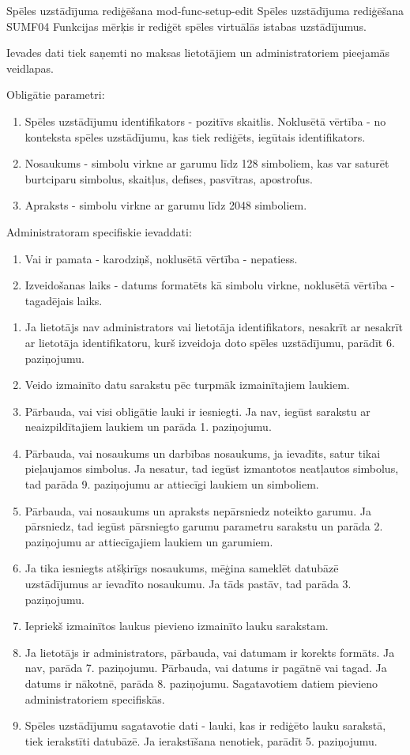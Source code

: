 \moduleFunctionTable
{Spēles uzstādījuma rediģēšana}
{mod-func-setup-edit}
{Spēles uzstādījuma rediģēšana}
{SUMF04}
{
	Funkcijas mērķis ir rediģēt spēles virtuālās istabas uzstādījumus.
}
{
	Ievades dati tiek saņemti no maksas lietotājiem un administratoriem pieejamās veidlapas.

	Obligātie parametri:
	\begin{enumerate}
		\item Spēles uzstādījumu identifikators - pozitīvs skaitlis.
		      Noklusētā vērtība - no konteksta spēles uzstādījumu, kas tiek rediģēts, iegūtais identifikators.
		\item Nosaukums - simbolu virkne ar garumu līdz 128 simboliem, kas var saturēt burtciparu simbolus, skaitļus, defises, pasvītras, apostrofus.
		\item Apraksts - simbolu virkne ar garumu līdz 2048 simboliem.
	\end{enumerate}

	Administratoram specifiskie ievaddati:
	\begin{enumerate}
		\item Vai ir pamata - karodziņš, noklusētā vērtība - nepatiess.
		\item Izveidošanas laiks - datums formatēts kā simbolu virkne, noklusētā vērtība - tagadējais laiks.
	\end{enumerate}
}
{
	\begin{enumerate}
		\item Ja lietotājs nav administrators vai lietotāja identifikators, nesakrīt ar nesakrīt ar lietotāja identifikatoru, kurš izveidoja doto spēles uzstādījumu, parādīt 6. paziņojumu.
		\item Veido izmainīto datu sarakstu pēc turpmāk izmainītajiem laukiem.
		\item Pārbauda, vai visi obligātie lauki ir iesniegti.
		      Ja nav, iegūst sarakstu ar neaizpildītajiem laukiem un parāda 1. paziņojumu.
		\item Pārbauda, vai nosaukums un darbības nosaukums, ja ievadīts, satur tikai pieļaujamos simbolus.
		      Ja nesatur, tad iegūst izmantotos neatļautos simbolus, tad parāda 9. paziņojumu ar attiecīgi laukiem un simboliem.
		\item Pārbauda, vai nosaukums un apraksts nepārsniedz noteikto garumu.
		      Ja pārsniedz, tad iegūst pārsniegto garumu parametru sarakstu un parāda 2. paziņojumu ar attiecīgajiem laukiem un garumiem.
		\item Ja tika iesniegts atšķirīgs nosaukums, mēģina sameklēt datubāzē uzstādījumus ar ievadīto nosaukumu.
		      Ja tāds pastāv, tad parāda 3. paziņojumu.
		\item Iepriekš izmainītos laukus pievieno izmainīto lauku sarakstam.
		\item Ja lietotājs ir administrators, pārbauda, vai datumam ir korekts formāts.
		      Ja nav, parāda 7. paziņojumu. Pārbauda, vai datums ir pagātnē vai tagad.
		      Ja datums ir nākotnē, parāda 8. paziņojumu.
		      Sagatavotiem datiem pievieno administratoriem specifiskās.
		\item Spēles uzstādījumu sagatavotie dati - lauki, kas ir rediģēto lauku sarakstā, tiek ierakstīti datubāzē.
		      Ja ierakstīšana nenotiek, parādīt 5. paziņojumu.
	\end{enumerate}
}
